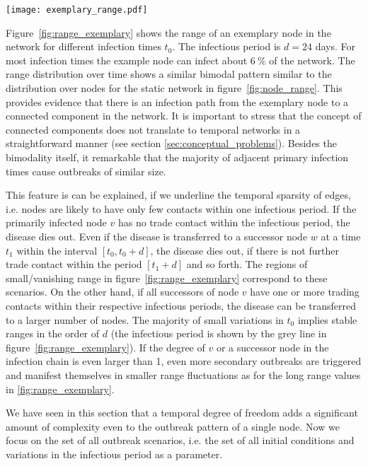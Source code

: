 \begin{SCfigure}
\texttt{[image: exemplary\_range.pdf]}
\caption{Temporal variation in the range $r(v,d,t_0)$ of an exemplary node $v$ in the network over one year.
Although the range remains rather constant for most infection times, it vanishes for certain periods.
The grey interval corresponds to the fixed infectious period $d=24$~days.
}
\label{fig:range_exemplary}
\end{SCfigure}
%
Figure~\ref{fig:range_exemplary} shows the range of an exemplary node in the network for different infection times $t_0$.
The infectious period is $d=24$ days.
For most infection times the example node can infect about $6~\%$ of the network.
The range distribution over time shows a similar bimodal pattern similar to the distribution over nodes for the static network in figure~\ref{fig:node_range}.
This provides evidence that there is an infection path from the exemplary node to a connected component in the network.
It is important to stress that the concept of connected components does not translate to temporal networks in a straightforward manner (see section \ref{sec:conceptual_problems}).
Besides the bimodality itself, it remarkable that the majority of adjacent primary infection times cause outbreaks of similar size.

This feature is can be explained, if we underline the temporal sparsity of edges, i.e. nodes are likely to have only few contacts within one infectious period.
If the primarily infected node $v$ has no trade contact within the infectious period, the disease dies out.
Even if the disease is transferred to a successor node $w$ at a time $t_1$ within the interval $[t_0,t_0+d]$, the disease dies out, if there is not further trade contact within the period $[t_1+d]$ and so forth.
The regions of small/vanishing range in figure~\ref{fig:range_exemplary} correspond to these scenarios.
On the other hand, if all successors of node $v$ have one or more trading contacts within their respective infectious periods, the disease can be transferred to a larger number of nodes.
The majority of small variations in $t_0$ implies stable ranges in the order of $d$ (the infectious period is shown by the grey line in figure~\ref{fig:range_exemplary}).
If the degree of $v$ or a successor node in the infection chain is even larger than 1, even more secondary outbreaks are triggered and manifest themselves in smaller range fluctuations as for the long range values in \ref{fig:range_exemplary}.

We have seen in this section that a temporal degree of freedom adds a significant amount of complexity even to the outbreak pattern of a single node.
Now we focus on the set of all outbreak scenarios, i.e. the set of all initial conditions and variations in the infectious period as a parameter.
%
